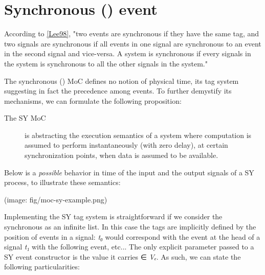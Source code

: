 \section{Synchronous () event}
According to \href{ForSyDe-Atom.html#lee98}{[Lee98]}, "two events
 are synchronous if they have the same tag, and two signals are
 synchronous if all events in one signal are synchronous to an
 event in the second signal and vice-versa. A system is
 synchronous if every signals in the system is synchronous to all
 the other signals in the system."\par
The synchronous () MoC defines no notion of physical time,
 its tag system suggesting in fact the precedence among events. To
 further demystify its mechanisms, we can formulate the following
 proposition:\par
\begin{description}
\item[The SY MoC] is abstracting the execution semantics of a system
 where computation is assumed to perform instantaneously (with
 zero delay), at certain synchronization points, when data is
 assumed to be available.
\end{description}Below is a \emph{possible} behavior in time of the input and the
 output signals of a SY process, to illustrate these semantics:\par
                 (image: fig/moc-sy-example.png)\par
                 Implementing the SY tag system is straightforward if we consider
 the synchronous  as an infinite list. In this case the
 tags are implicitly defined by the position of events in a
 signal: \emph{t₀} would correspond with the event at the head of
 a signal \emph{t₁} with the following event, etc... The only
 explicit parameter passed to a SY event constructor is the value
 it carries ∈ \emph{Vₑ}. As such, we can state the
 following particularities:\par
